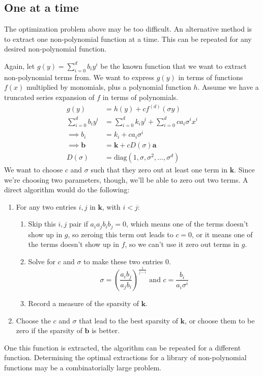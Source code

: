 \documentclass{article}
\let\vec\mathbf
\begin{document}
\subsection{One at a time}

The optimization problem above may be too difficult. An alternative method is to
extract one non-polynomial function at a time. This can be repeated for any
desired non-polynomial function.

Again, let $g(y) = \sum_{i=0}^d b_i y^i$ be the known function that we want to
extract non-polynomial terms from. We want to express $g(y)$ in terms of
functions $f(x)$ multiplied by monomials, plus a polynomial function $h$.
Assume we have a truncated series expansion of $f$ in terms of polynomials.
\begin{align*}
g(y) &= h(y) + c f^{(d)}(\sigma y) \\
\sum_{i=0}^d b_i y^i &= \sum_{i=0}^d k_i y^i + \sum_{i=0}^d c a_i \sigma^i x^i
\\ \implies b_i &= k_i + c a_i \sigma^i 
\\ \implies \vec{b} &= \vec{k} + c D(\sigma) \vec{a} 
\\ D(\sigma) &= \text{diag}(1, \sigma, \sigma^2, \ldots, \sigma^d)
\end{align*}
We want to choose $c$ and $\sigma$ such that they zero out at least one term in $\vec{k}$.
Since we're choosing two parameters, though, we'll be able to zero out two terms.
A direct algorithm would do the following:
\begin{enumerate}
  \item For any two entries $i,j$ in $\vec{k}$, with $i < j$:
  \begin{enumerate}
    \item Skip this $i,j$ pair if $a_i a_j b_i b_j = 0$, which means  one of the
      terms doesn't show up in $g$, so zeroing this term out leads to $c = 0$,
      or it means one of the terms doesn't show up in $f$, so we can't use it
      zero out terms in $g$.
    \item Solve for $c$ and $\sigma$ to make these two entries 0.
      \begin{equation*}
        \sigma = \left(\frac{a_i b_j}{a_j b_i} \right)^{\frac{1}{j-i}} \text{ and } c = \frac{b_i}{a_i\sigma^i}
      \end{equation*}
    \item Record a measure of the sparsity of $\vec{k}$.
  \end{enumerate}
  \item Choose the $c$ and $\sigma$ that lead to the best sparsity of $\vec{k}$,
  or choose them to be zero if the sparsity of $\vec{b}$ is better.
\end{enumerate}
One this function is extracted, the algorithm can be repeated for a different
function. Determining the optimal extractions for a library of non-polynomial
functions may be a combinatorially large problem.
\end{document}
